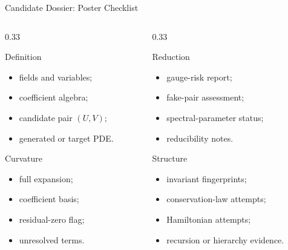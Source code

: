 \documentclass[aspectratio=169,11pt]{beamer}
\begin{document}
\begin{frame}{Candidate Dossier: Poster Checklist}
  \begin{columns}[T,totalwidth=\textwidth]
    \begin{column}{0.33\textwidth}
      \begin{block}{Definition}
        \begin{itemize}
          \item fields and variables;
          \item coefficient algebra;
          \item candidate pair $(U,V)$;
          \item generated or target PDE.
        \end{itemize}
      \end{block}
      \begin{block}{Curvature}
        \begin{itemize}
          \item full expansion;
          \item coefficient basis;
          \item residual-zero flag;
          \item unresolved terms.
        \end{itemize}
      \end{block}
    \end{column}
    \begin{column}{0.33\textwidth}
      \begin{block}{Reduction}
        \begin{itemize}
          \item gauge-risk report;
          \item fake-pair assessment;
          \item spectral-parameter status;
          \item reducibility notes.
        \end{itemize}
      \end{block}
      \begin{block}{Structure}
        \begin{itemize}
          \item invariant fingerprints;
          \item conservation-law attempts;
          \item Hamiltonian attempts;
          \item recursion or hierarchy evidence.
        \end{itemize}
      \end{block}

\end{column}
\end{columns}
\end{frame}
\end{document}
